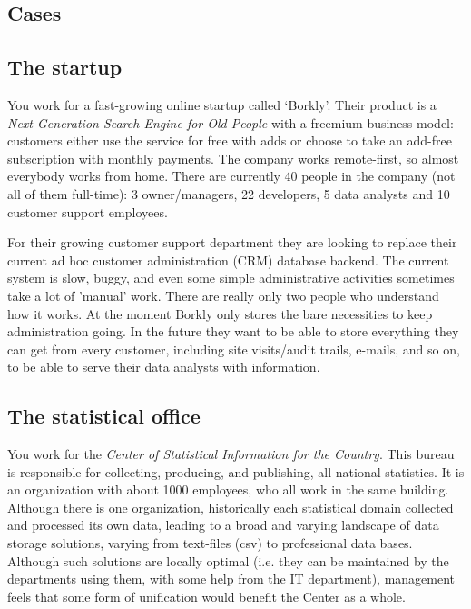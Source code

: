 \begin{subappendices}
\section{Cases}
\subsection{The startup}

You work for a fast-growing online startup called `Borkly'. Their product is a
\emph{Next-Generation Search Engine for Old People} with a freemium business model:
customers either use the service for free with adds or choose to take an
add-free subscription with monthly payments. The company works remote-first, so
almost everybody works from home. There are currently 40 people in the company
(not all of them full-time): 3 owner/managers, 22 developers, 5 data analysts
and 10 customer support employees.

For their growing customer support department they are looking to replace their
current ad hoc customer administration (CRM) database backend. The current
system is slow, buggy, and even some simple administrative activities sometimes
take a lot of 'manual' work. There are really only two people who understand how
it works. At the moment Borkly only stores the bare necessities to keep
administration going. In the future they want to be able to store everything
they can get from every customer, including site visits/audit trails, e-mails,
and so on, to be able to serve their data analysts with information.



\subsection{The statistical office}

You work for the \emph{Center of Statistical Information for the Country}. This
bureau is responsible for collecting, producing, and publishing, all national
statistics. It is an organization with about 1000 employees, who all work in the
same building. Although there is one organization, historically each statistical
domain collected and processed its own data, leading to a broad and varying
landscape of data storage solutions, varying from text-files (csv) to
professional data bases. Although such solutions are locally optimal (i.e. they
can be maintained by the departments using them, with some help from the IT
department), management feels that some form of unification would benefit the
Center as a whole.


\end{subappendices}
